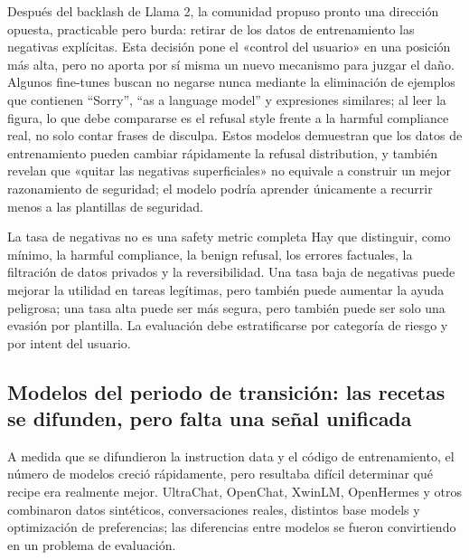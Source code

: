 Después del backlash de Llama 2, la comunidad propuso pronto una dirección opuesta, practicable pero burda: retirar de los datos de entrenamiento las negativas explícitas. Esta decisión pone el «control del usuario» en una posición más alta, pero no aporta por sí misma un nuevo mecanismo para juzgar el daño. Algunos fine-tunes buscan no negarse nunca mediante la eliminación de ejemplos que contienen ``Sorry'', ``as a language model'' y expresiones similares; al leer la figura, lo que debe compararse es el refusal style frente a la harmful compliance real, no solo contar frases de disculpa. Estos modelos demuestran que los datos de entrenamiento pueden cambiar rápidamente la refusal distribution, y también revelan que «quitar las negativas superficiales» no equivale a construir un mejor razonamiento de seguridad; el modelo podría aprender únicamente a recurrir menos a las plantillas de seguridad.


\begin{warningbox}{La tasa de negativas no es una safety metric completa}
Hay que distinguir, como mínimo, la harmful compliance, la benign refusal, los errores factuales, la filtración de datos privados y la reversibilidad. Una tasa baja de negativas puede mejorar la utilidad en tareas legítimas, pero también puede aumentar la ayuda peligrosa; una tasa alta puede ser más segura, pero también puede ser solo una evasión por plantilla. La evaluación debe estratificarse por categoría de riesgo y por intent del usuario.
\end{warningbox}


\subsection{Modelos del periodo de transición: las recetas se difunden, pero falta una señal unificada}

A medida que se difundieron la instruction data y el código de entrenamiento, el número de modelos creció rápidamente, pero resultaba difícil determinar qué recipe era realmente mejor. UltraChat, OpenChat, XwinLM, OpenHermes y otros combinaron datos sintéticos, conversaciones reales, distintos base models y optimización de preferencias; las diferencias entre modelos se fueron convirtiendo en un problema de evaluación.

